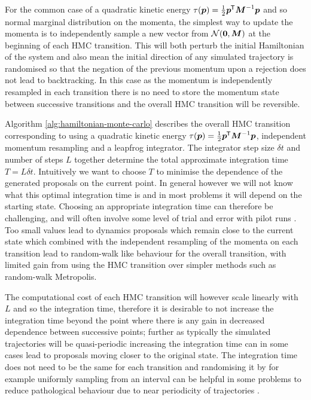 For the common case of a quadratic kinetic energy $\tau(\boldsymbol{p}) = \frac{1}{2}\boldsymbol{p}^{\mkern-1.5mu\mathsf{T}}\boldsymbol{M}^{-1}\boldsymbol{p}$ and so normal marginal distribution on the momenta, the simplest way to update the momenta is to independently sample a new vector from $\nrm{\vct{0},\mtx{M}}$ at the beginning of each \ac{HMC} transition. This will both perturb the initial Hamiltonian of the system and also mean the initial direction of any simulated trajectory is randomised so that the negation of the previous momentum upon a rejection does not lead to backtracking. In this case as the momentum is independently resampled in each transition there is no need to store the momentum state between successive transitions and the overall \ac{HMC} transition will be reversible.  

Algorithm \ref{alg:hamiltonian-monte-carlo} describes the overall \ac{HMC} transition corresponding to using a quadratic kinetic energy $\tau(\boldsymbol{p}) = \frac{1}{2}\boldsymbol{p}^{\mkern-1.5mu\mathsf{T}}\boldsymbol{M}^{-1}\boldsymbol{p}$, independent moment\-um resampling and a leapfrog integrator. The integrator step size $\delta t$ and number of steps $L$ together determine the total approximate integration time $T = L \delta t$. Intuitively we want to choose $T$ to minimise the dependence of the generated proposals on the current point. In general however we will not know what this optimal integration time is and in most problems it will depend on the starting state. Choosing an appropriate integration time can therefore be challenging, and will often involve some level of trial and error with pilot runs \citep{neal2011mcmc}. Too small values lead to dynamics proposals which remain close to the current state which combined with the independent resampling of the momenta on each transition lead to random-walk like behaviour for the overall transition, with limited gain from using the \ac{HMC} transition over simpler methods such as random-walk Metropolis. 

The computational cost of each \ac{HMC} transition will however scale linearly with $L$ and so the integration time, therefore it is desirable to not increase the integration time beyond the point where there is any gain in decreased dependence between successive points; further as typically the simulated trajectories will be quasi-periodic increasing the integration time can in some cases lead to proposals moving closer to the original state. The integration time does not need to be the same for each transition and randomising it by for example uniformly sampling from an interval can be helpful in some problems to reduce pathological behaviour due to near periodicity of trajectories \citep{neal2011mcmc}.

